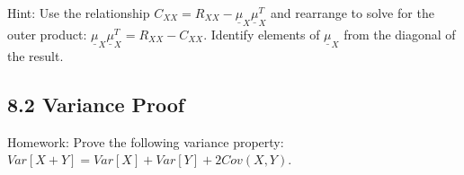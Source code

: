 \documentclass[12pt]{article}
\begin{document}
\noindent
Hint: Use the relationship $C_{XX}=R_{XX}-\underline{\mu}_{X}\underline{\mu}_{X}^{T}$ and rearrange to solve for the outer product: $\underline{\mu}_{X}\underline{\mu}_{X}^{T} = R_{XX} - C_{XX}$. Identify elements of $\underline{\mu}_{X}$ from the diagonal of the result.

\subsection*{8.2 Variance Proof}
Homework: Prove the following variance property: $Var[X+Y] = Var[X] + Var[Y] + 2Cov(X,Y)$.
\end{document}
